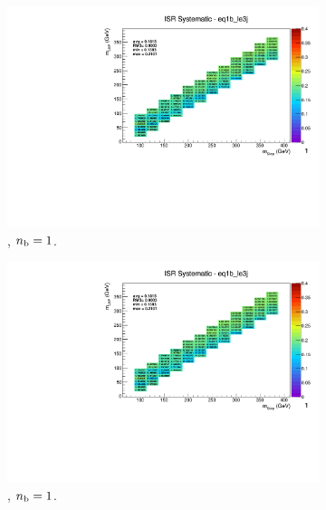 \begin{figure}[ht!]
\begin{subfigure}[b]{0.32\textwidth}
    \includegraphics[width=\textwidth, page=9]{Figs/sms/t2degen/v19_3/systs/T2_4body_ISR_eq1b_le3j.pdf}
    \caption{\njlow, $n_{\text{b}} = 1$.}
  \end{subfigure}
  \begin{subfigure}[b]{0.32\textwidth}
    \includegraphics[width=\textwidth, page=1]{Figs/sms/t2degen/v19_3/systs/T2_4body_ISR_eq1b_le3j.pdf}
    \caption{\njlow, $n_{\text{b}} = 1$.}
  \end{subfigure}\\
  \begin{subfigure}[b]{0.32\textwidth}

\end{subfigure}
\end{figure}
